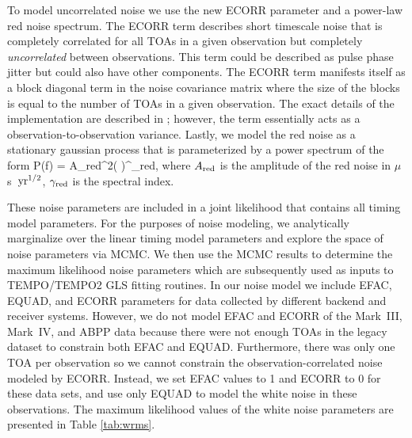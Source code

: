 To model uncorrelated noise we use the new ECORR parameter and a power-law red noise spectrum.
The ECORR term describes short timescale noise that is completely correlated
for all TOAs in a given observation
but completely \emph{uncorrelated} between observations. This term could be described as pulse phase jitter \citep{cs10}
but could also have other components. The ECORR term manifests itself as a block diagonal term in the noise covariance
matrix where the size of the blocks is equal to the number of TOAs in a given
observation. The exact details of the implementation are described in
\cite{abb+15b}; however, the term essentially acts as a
observation-to-observation variance. 
Lastly, we model the red noise as a stationary gaussian process that is parameterized by a power spectrum of the form
\be
P(f) = A_{\rm red}^2\left(  \right)^{\gamma_{\rm red}},
\ee
where $A_{\rm red}$ is the amplitude of the red noise in $\mu$s~${\rm yr}^{1/2}$, $\gamma_{\rm red}$ is the spectral index.

These noise parameters are included in a joint likelihood that contains all timing model parameters. For the purposes of noise modeling, we analytically marginalize over the linear timing model parameters and explore the space of noise parameters via MCMC. We then use the MCMC results to determine the maximum likelihood noise parameters which are subsequently used as inputs to \textsc{TEMPO}/\textsc{TEMPO2} GLS fitting routines. 
In our noise model we include EFAC, EQUAD, and ECORR parameters
for data collected by different backend and receiver systems. However, we do not model 
EFAC and ECORR of the Mark~III, Mark~IV, and ABPP data because there were not
enough TOAs in the legacy dataset to constrain both EFAC and EQUAD. Furthermore,
there was only one TOA per observation so we cannot constrain the observation-correlated
noise modeled by ECORR. Instead, we set EFAC values to 1
and ECORR to 0 for these data sets, and use only EQUAD to model the white
noise in these observations. 
The maximum likelihood values of the white noise parameters are presented in Table \ref{tab:wrms}.






